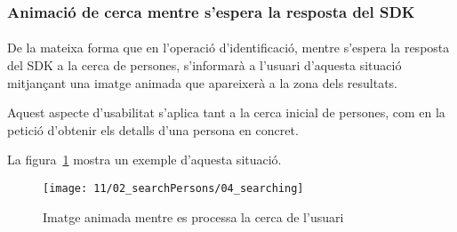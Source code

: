 \subsubsection{Animació de cerca mentre s'espera la resposta del SDK}

\paragraph{}
De la mateixa forma que en l'operació d'identificació, mentre s'espera la resposta del SDK a la cerca de persones, s'informarà a l'usuari d'aquesta situació mitjançant una imatge animada que apareixerà a la zona dels resultats.

Aquest aspecte d'usabilitat s'aplica tant a la cerca inicial de persones, com en la petició d’obtenir els detalls d’una persona en concret.

La figura~\ref{fig:pSearchLoading} mostra un exemple d'aquesta situació.

\begin{figure}[h]
    \texttt{[image: 11/02\_searchPersons/04\_searching]}
    \centering
    \caption{Imatge animada mentre es processa la cerca de l'usuari}\label{fig:pSearchLoading}
\end{figure}
